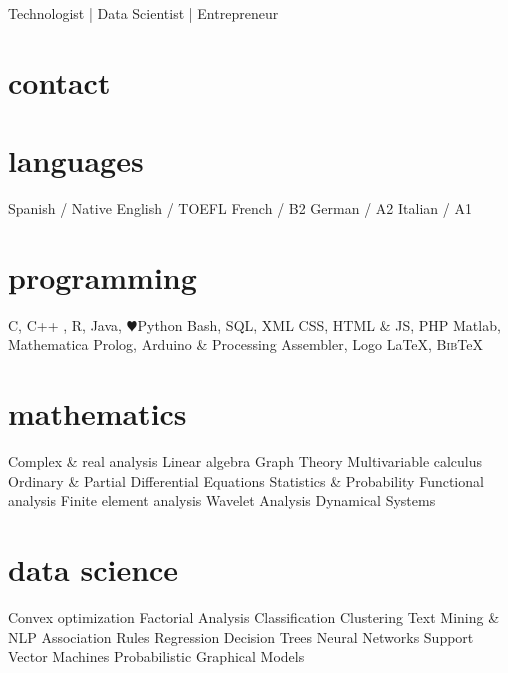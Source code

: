 \documentclass[]{friggeri-cv}
\begin{document}
       {Technologist | Data Scientist | Entrepreneur}


\begin{aside}
  \section{contact} 
  \makecvheader
  \section{languages}
    Spanish / Native
    English / TOEFL
    French / B2
    German / A2
    Italian / A1
  \section{programming}
    C, C++ , R, Java, {\color{red} $\varheartsuit$}Python
    Bash, SQL, XML
    CSS, HTML \& JS, PHP
    Matlab, Mathematica
    Prolog, %
    Arduino \& Processing
    Assembler, Logo
    \LaTeX{}, B\textsc{ib}\TeX{}
   \section{mathematics}  
   Complex \& real analysis
   Linear algebra
   Graph Theory
   Multivariable calculus
   Ordinary \& Partial Differential Equations
   Statistics \& Probability
   Functional analysis
   Finite element analysis
   Wavelet Analysis
   Dynamical Systems
   \section{data science}
   Convex optimization
   Factorial Analysis
   Classification
   Clustering
   Text Mining \& NLP
   Association Rules
   Regression
   Decision Trees
   Neural Networks
   Support Vector Machines
   Probabilistic Graphical Models
\end{aside}
\end{document}
